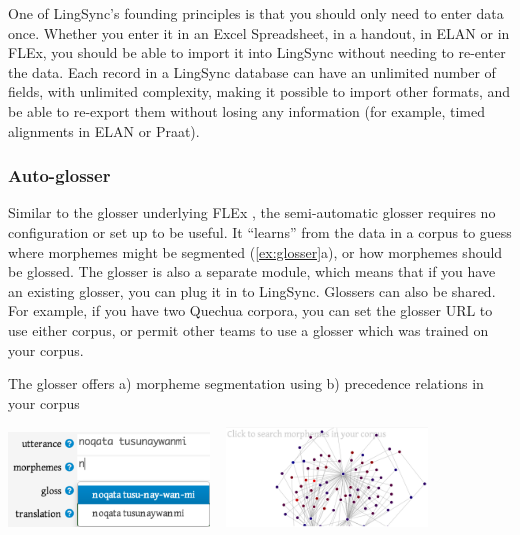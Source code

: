 \documentclass[letterpaper, 12pt, dvips]{mitwpl}
\begin{document}
One of LingSync's founding principles is that you should only need to enter data once.
Whether you enter it in an Excel Spreadsheet,
in a handout,
in ELAN or in FLEx,
you should be able to import it into LingSync without needing to re-enter the data.
 Each record in a LingSync database can have an unlimited number of fields,
with unlimited complexity,
making it possible to import other formats,
and be able to re-export them without losing any information (for example,
timed alignments in ELAN or Praat).



\subsubsection{Auto-glosser}

 

Similar to the glosser underlying FLEx \citep{Black:2006}, the semi-automatic glosser requires no configuration or set up to be useful.
It ``learns'' from the data in a corpus to guess where morphemes might be segmented (\ref{ex:glosser}a),
or how morphemes should be glossed.
The glosser is also a separate module,
which means that if you have an existing glosser, you can plug it in to LingSync.
Glossers can also be shared.
For example,
if you have two Quechua corpora,
you can set the glosser URL to use either corpus, or permit other teams to use a glosser which was trained on your corpus.
 


\begin{exe} 
\ex The glosser offers a) morpheme segmentation using b) precedence relations in your corpus

 \centering
   \includegraphics[width=0.4\textwidth]{glosser} ~
   \includegraphics[width=0.4\textwidth]{morphemePrecedenceRelations}

\label{ex:glosser}
\end{exe}
\end{document}
